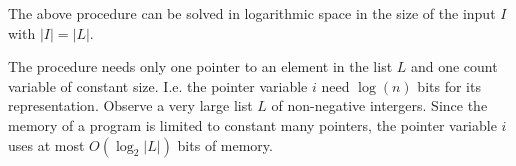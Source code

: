 The above procedure can be solved in logarithmic space in the size of the
input $I$ with $|I|=|L|$.

The procedure needs only one pointer to an element in the list $L$ and one
count variable of constant size. I.e. the pointer variable $i$ need $\log
(n) $ bits for its representation. Observe a very large list $L$ of
non-negative intergers. Since the memory of a program is limited to constant
many pointers, the pointer variable $i$ uses at most $O(\log _{2}|L|)$ bits
of memory.

\bigskip


%
